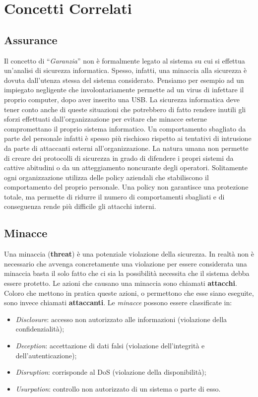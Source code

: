 \section{Concetti Correlati}

\subsection{Assurance}

Il concetto di “\textit{Garanzia}” non è formalmente legato al sistema su cui si
effettua un’analisi di sicurezza informatica. Spesso, infatti, una minaccia
alla sicurezza è dovuta dall'utenza stessa del sistema considerato.
Pensiamo per esempio ad un impiegato negligente che involontariamente permette ad
un virus di infettare il proprio computer, dopo aver inserito una USB.
La sicurezza informatica deve tener conto anche di queste situazioni che
potrebbero di fatto rendere inutili gli sforzi effettuati dall'organizzazione
per evitare che minacce esterne compromettano il proprio sistema informatico.
Un comportamento sbagliato da parte del personale infatti è spesso più rischioso
rispetto ai tentativi di intrusione da parte di attaccanti esterni all’organizzazione.
La natura umana non permette di creare dei protocolli di sicurezza in grado di
difendere i propri sistemi da cattive abitudini o da un atteggiamento noncurante
degli operatori. Solitamente ogni organizzazione utilizza delle policy aziendali
che stabiliscono il comportamento del proprio personale. Una policy non
garantisce una protezione totale, ma permette di ridurre il numero di comportamenti
sbagliati e di conseguenza rende più difficile gli attacchi interni.

\subsection{Minacce}

Una minaccia (\textbf{threat}) è una potenziale violazione della sicurezza.
In realtà non è necessario che avvenga concretamente una violazione per essere
considerata una minaccia basta il solo fatto che ci sia la possibilità necessita che
il sistema debba essere protetto.
Le azioni che causano una minaccia sono chiamati \textbf{attacchi}. Coloro che
mettono in pratica queste azioni, o permettono che esse siano eseguite, sono
invece chiamati \textbf{attaccanti}.
Le \textit{minacce} possono essere classificate in:

\begin{itemize}
    \item \textit{Disclosure}: accesso non autorizzato alle informazioni
          (violazione della confidenzialità);
    \item \textit{Deception}: accettazione di dati falsi
          (violazione dell’integrità e dell’autenticazione);
    \item \textit{Disruption}: corrisponde al DoS
          (violazione della disponibilità);
    \item \textit{Usurpation}: controllo non autorizzato di un sistema o parte
          di esso.
\end{itemize}

